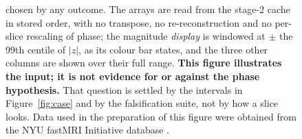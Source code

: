 \documentclass[11pt,a4paper]{article}
\begin{document}
\begin{figure}[htbp]
{chosen by any outcome. The arrays are read from the stage-2 cache in stored
order, with no transpose, no re-reconstruction and no per-slice rescaling of
phase; the magnitude \emph{display} is windowed at $\pm$ the 99th centile of
$|z|$, as its colour bar states, and the three other columns are shown over
their full range. \textbf{This figure illustrates the input; it is not evidence for or
against the phase hypothesis.} That question is settled by the intervals in
Figure~\ref{fig:case} and by the falsification suite, not by how a slice looks.
Data used in the preparation of this figure were obtained from the NYU fastMRI
Initiative database \citep{knoll2020fastmri,zbontar2018fastmri,tibrewala2023fastmriprostate}.}
\label{fig:input}
\end{figure}

\clearpage


\end{document}
